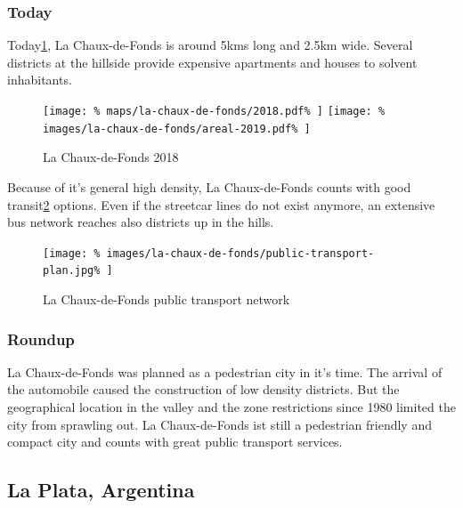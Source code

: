 \documentclass[twocolumn]{article}
\begin{document}
			
			\subsubsection{Today}
			
			Today\ref{fig:map:la-chaux-de-fonds-2018}, La Chaux-de-Fonds is around 5kms long and 2.5km wide. Several districts at the hillside provide expensive apartments and houses to solvent inhabitants.
			
			\begin{figure}[H]
				\texttt{[image: \%
					maps/la-chaux-de-fonds/2018.pdf\%
				]}
				\texttt{[image: \%
					images/la-chaux-de-fonds/areal-2019.pdf\%
				]}
				\caption{La Chaux-de-Fonds 2018\cite{MapGeoAdmin:LaChauxDeFonds}}
				\label{fig:map:la-chaux-de-fonds-2018}
			\end{figure}
			
			Because of it's general high density, La Chaux-de-Fonds counts with good transit\ref{fig:la-chaux-de-fonds-public-transport} options. Even if the streetcar lines do not exist anymore, an extensive bus network reaches also districts up in the hills.
			
			
			
			\begin{figure}[H]
				\texttt{[image: \%
					images/la-chaux-de-fonds/public-transport-plan.jpg\%
				]}
				\caption{La Chaux-de-Fonds public transport network\cite{TransN:LaChauxDeFonds}}
				\label{fig:la-chaux-de-fonds-public-transport}
			\end{figure}
			
			
			\subsubsection{Roundup}
			La Chaux-de-Fonds was planned as a pedestrian city in it's time.
			The arrival of the automobile caused the construction of low density districts.
			But the geographical location in the valley and the zone restrictions since 1980 limited the city from sprawling out.
			La Chaux-de-Fonds ist still a pedestrian friendly and compact city and counts with great public transport services.
			
			
		\clearpage
		\begin{strip}
		\subsection{La Plata, Argentina}
		\end{strip}
		
\end{document}

